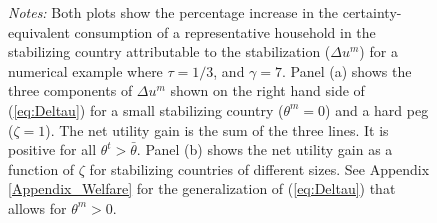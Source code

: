 \documentclass[12pt,letter]{article}
\theoremstyle{break} \theorembodyfont{\normalfont\itshape}
\theoremstyle{break}
\theoremstyle{break} \theorembodyfont{\normalfont\itshape}
\theoremstyle{break} \theorembodyfont{\normalfont\itshape}
\begin{document}
\begin{figure}[!ht]
\begin{minipage}{\linewidth}
\begin{centering}
\end{centering}
\bigskip

\small \textit{Notes:} Both plots show the percentage increase in the
certainty-equivalent consumption of a representative household in the
stabilizing country attributable to the stabilization ($\Delta u^m $)
for a numerical example where \(\tau=1/3\), and \(\gamma=7\). Panel
(a) shows the three components of $\Delta u^m $ shown on the right
hand side of (\ref{eq:Deltau}) for a small stabilizing country
($\theta^m=0$) and a hard peg (\(\zeta=1\)). The net utility gain is
the sum of the three lines. It is positive for all
\(\theta^t>\bar{\theta}\). Panel (b) shows the net utility gain as a
function of \(\zeta\) for stabilizing countries of different sizes.
See Appendix \ref{Appendix_Welfare} for the generalization of
(\ref{eq:Deltau}) that allows for $\theta^m>0$. \end{minipage}
\end{figure}

\clearpage
\end{document}
